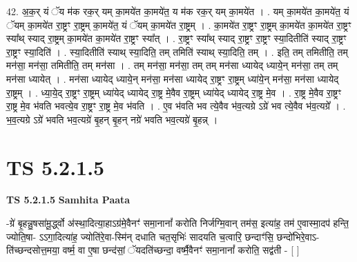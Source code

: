 \documentclass[17pt]{extarticle}
\begin{document}
42. अ॒क॒र् यं ॅय म॑क रक॒र् यम् का॒मये॑त का॒मये॑त॒ य म॑क रक॒र् यम् का॒मये॑त । . यम् का॒मये॑त का॒मये॑त॒ यं ॅयम् का॒मये॑त रा॒ष्ट्रꣳ रा॒ष्ट्रम् का॒मये॑त॒ यं ॅयम् का॒मये॑त रा॒ष्ट्रम् । . का॒मये॑त रा॒ष्ट्रꣳ रा॒ष्ट्रम् का॒मये॑त का॒मये॑त रा॒ष्ट्रꣳ स्या᳚थ् स्याद् रा॒ष्ट्रम् का॒मये॑त का॒मये॑त रा॒ष्ट्रꣳ स्या᳚त् । . रा॒ष्ट्रꣳ स्या᳚थ् स्याद् रा॒ष्ट्रꣳ रा॒ष्ट्रꣳ स्या॒दितीति॑ स्याद् रा॒ष्ट्रꣳ रा॒ष्ट्रꣳ स्या॒दिति॑ । . स्या॒दितीति॑ स्याथ् स्या॒दिति॒ तम् तमिति॑ स्याथ् स्या॒दिति॒ तम् । . इति॒ तम् तमितीति॒ तम् मन॑सा॒ मन॑सा॒ तमितीति॒ तम् मन॑सा । . तम् मन॑सा॒ मन॑सा॒ तम् तम् मन॑सा ध्यायेद् ध्याये॒न् मन॑सा॒ तम् तम् मन॑सा ध्यायेत् । . मन॑सा ध्यायेद् ध्याये॒न् मन॑सा॒ मन॑सा ध्यायेद् रा॒ष्ट्रꣳ रा॒ष्ट्रम् ध्या॑ये॒न् मन॑सा॒ मन॑सा ध्यायेद् रा॒ष्ट्रम् । . ध्या॒ये॒द् रा॒ष्ट्रꣳ रा॒ष्ट्रम् ध्या॑येद् ध्यायेद् रा॒ष्ट्र मे॒वैव रा॒ष्ट्रम् ध्या॑येद् ध्यायेद् रा॒ष्ट्र मे॒व । . रा॒ष्ट्र मे॒वैव रा॒ष्ट्रꣳ रा॒ष्ट्र मे॒व भ॑वति भवत्ये॒व रा॒ष्ट्रꣳ रा॒ष्ट्र मे॒व भ॑वति । . ए॒व भ॑वति भव त्ये॒वैव भ॑व॒त्यग्रे ऽग्रे॑ भव त्ये॒वैव भ॑व॒त्यग्रे᳚ । . भ॒व॒त्यग्रे ऽग्रे॑ भवति भव॒त्यग्रे॑ बृ॒हन् बृ॒हन् नग्रे॑ भवति भव॒त्यग्रे॑ बृ॒हन्न् । \newline
\pagebreak
{}

\section{ TS 5.2.1.5 }

\textbf{TS 5.2.1.5 } \newline
\textbf{Samhita Paata} \newline

-ग्रे॑ बृ॒हन्नु॒षसा॑मू॒र्द्ध्वो अ॑स्था॒दित्या॒हाऽग्र॑मे॒वैनꣳ॑ समा॒नानां᳚ करोति निर्जग्मि॒वान् तम॑स॒ इत्या॑ह॒ तम॑ ए॒वास्मा॒दप॑ हन्ति॒ ज्योति॒षा- ऽऽगा॒दित्या॑ह॒ ज्योति॑रे॒वा-स्मि॑न् दधाति चत॒सृभिः॑ सादयति च॒त्वारि॒ छन्दाꣳ॑सि॒ छन्दो॑भिरे॒वाऽ-ति॑च्छन्दसोत्त॒मया॒ वर्ष्म॒ वा ए॒षा छन्द॑सां॒ ॅयदति॑च्छन्दा॒ वर्ष्मै॒वैनꣳ॑ समा॒नानां᳚ करोति॒ सद्व॑ती - [  ] \newline
\end{document}
